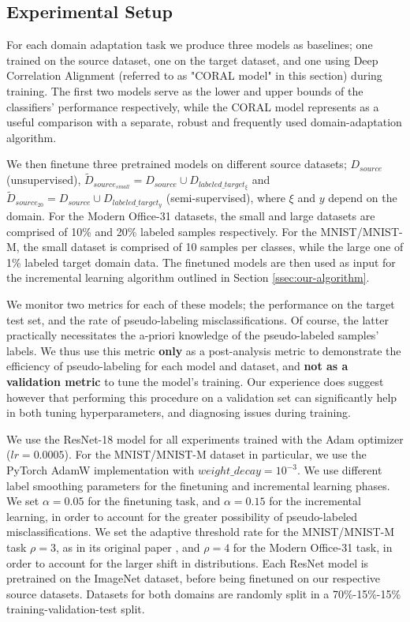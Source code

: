 \documentclass[12pt, a4paper]{article}
\begin{document}
	
	\subsection{Experimental Setup}
	
	For each domain adaptation task we produce three models as baselines; one trained on the source dataset, one on the target dataset, and one using Deep Correlation Alignment \parencite{coral} (referred to as "CORAL model" in this section) during training. The first two models serve as the lower and upper bounds of the classifiers' performance respectively, while the CORAL model represents as a useful comparison with a separate, robust and frequently used domain-adaptation algorithm.
	
	We then finetune three pretrained models on different source datasets; $D_{source}$ (unsupervised), $\tilde{D}_{source_{small}} = D_{source} \cup D_{labeled\_target_{\xi}}$ and $\tilde{D}_{source_{20}} = D_{source} \cup D_{labeled\_target_{y}}$ (semi-supervised), where $\xi$ and $y$ depend on the domain. For the Modern Office-31 datasets, the small and large datasets are comprised of 10\% and 20\% labeled samples respectively. For the MNIST/MNIST-M, the small dataset is comprised of 10 samples per classes, while the large one of 1\% labeled target domain data. The finetuned models are then used as input for the incremental learning algorithm outlined in Section \ref{ssec:our-algorithm}.
	
	We monitor two metrics for each of these models; the performance on the target test set, and the rate of pseudo-labeling misclassifications. Of course, the latter practically necessitates the a-priori knowledge of the pseudo-labeled samples' labels. We thus use this metric \textbf{only} as a post-analysis metric to demonstrate the efficiency of pseudo-labeling for each model and dataset, and \textbf{not as a validation metric} to tune the model's training. Our experience does suggest however that performing this procedure on a validation set can significantly help in both tuning hyperparameters, and diagnosing issues during training.
	
	We use the ResNet-18 model \parencite{resnet} for all experiments trained with the Adam optimizer ($lr=0.0005$). For the MNIST/MNIST-M dataset in particular, we use the PyTorch AdamW implementation with $weight\_decay = 10^{-3}$. We use different label smoothing parameters for the finetuning and incremental learning phases. We set $\alpha = 0.05$ for the finetuning task, and $\alpha = 0.15$ for the incremental learning, in order to account for the greater possibility of pseudo-labeled misclassifications. We set the adaptive threshold rate for the MNIST/MNIST-M task $\rho = 3$, as in its original paper \cite{ican}, and $\rho=4$ for the Modern Office-31 task, in order to account for the larger shift in distributions. Each ResNet model is pretrained on the ImageNet \cite{imagenet} dataset, before being finetuned on our respective source datasets. Datasets for both domains are randomly split in a 70\%-15\%-15\% training-validation-test split.
	
\end{document}
